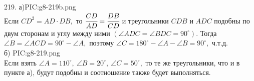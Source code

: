 219. а){{PIC:g8-219b.png}}\\
Если $CD^2=AD\cdot DB,$ то $\cfrac{CD}{AD}=\cfrac{DB}{CD}$ и треугольники $CDB$ и $ADC$ подобны по двум сторонам и углу между ними $(\angle ADC=\angle BDC=90^\circ).$ Тогда $\angle B=\angle ACD=90^\circ-\angle A,$ поэтому $\angle C=180^\circ-\angle A-\angle B=90^\circ,$ ч.т.д.\\
б) {{PIC:g8-219.png}}\\
Если взять $\angle A=110^\circ,\ \angle B=20^\circ,\ \angle C=50^\circ,$ то те же треугольники, что и в пункте а), будут подобны и соотношение также будет выполняться.\\
